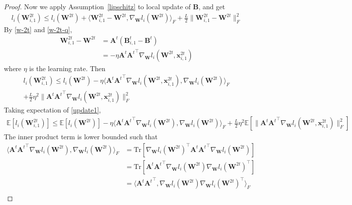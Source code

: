 \begin{proof}
Now we apply Assumption~\ref{lipschitz} to local update of $\mathbf{B}$, and get
\begin{align}
    l_i(\mathbf{W}_{i,1}^{2t}) \leq l_i(\mathbf{W}^{2t}) + \langle \mathbf{W}_{i,1}^{2t}- \mathbf{W}^{2t}, \nabla_{\mathbf{W}} l_i(\mathbf{W}^{2t})\rangle_F + \frac{L}{2} \| \mathbf{W}_{i,1}^{2t} - \mathbf{W}^{2t} \|_F^2 \label{eq:lipschitz-1}
\end{align}
By \eqref{w-2t} and \eqref{w-2t-q}, 
\begin{align}
    \mathbf{W}_{i,1}^{2t} - \mathbf{W}^{2t} &= \mathbf{A}^t (\mathbf{B}_{i,1}^t-\mathbf{B}^t) \label{eq:gd-fixA}\\
    & = -\eta \mathbf{A}^t {\mathbf{A}^t}^\top \nabla_{\mathbf{W}} l_i(\mathbf{W}^{2t},\mathbf{x}_{i,1}^{2t})
\end{align}
where $\eta$ is the learning rate. Then
\begin{align}
    l_i(\mathbf{W}_{i,1}^{2t}) \leq l_i(\mathbf{W}^{2t}) -\eta \langle \mathbf{A}^t {\mathbf{A}^t}^\top \nabla_{\mathbf{W}} l_i(\mathbf{W}^{2t},\mathbf{x}_{i,1}^{2t}), \nabla_{\mathbf{W}} l_i(\mathbf{W}^{2t})\rangle_F \nonumber\\+ \frac{L}{2} \eta^2 \|  \mathbf{A}^t {\mathbf{A}^t}^\top \nabla_{\mathbf{W}} l_i(\mathbf{W}^{2t},\mathbf{x}_{i,1}^{2t}) \|_F^2 \label{update1}
\end{align}
Taking expectation of \eqref{update1},
\begin{align}
    \mathbb{E}[l_i(\mathbf{W}_{i,1}^{2t})] \leq \mathbb{E}[ l_i(\mathbf{W}^{2t})] - \eta \langle \mathbf{A}^t {\mathbf{A}^t}^\top \nabla_{\mathbf{W}} l_i(\mathbf{W}^{2t}), \nabla_{\mathbf{W}} l_i(\mathbf{W}^{2t})\rangle_F + \frac{L}{2} \eta^2  \mathbb{E}[\|  \mathbf{A}^t {\mathbf{A}^t}^\top \nabla_{\mathbf{W}} l_i(\mathbf{W}^{2t},\mathbf{x}_{i,1}^{2t}) \|_F^2 ] \label{exp-1}
\end{align}
The inner product term is lower bounded such that
\begin{align}
    \langle \mathbf{A}^t {\mathbf{A}^t}^\top \nabla_{\mathbf{W}} l_i(\mathbf{W}^{2t}), \nabla_{\mathbf{W}} l_i(\mathbf{W}^{2t})\rangle_F & = \text{Tr}[{\nabla_{\mathbf{W}} l_i (\mathbf{W}^{2t})}^\top \mathbf{A}^t {\mathbf{A}^t}^\top \nabla_{\mathbf{W}} l_i (\mathbf{W}^{2t})] \\
    & = \text{Tr}[ \mathbf{A}^t {\mathbf{A}^t}^\top \nabla_{\mathbf{W}} l_i (\mathbf{W}^{2t}){\nabla_{\mathbf{W}} l_i (\mathbf{W}^{2t})}^\top] \\
     & =  \langle \mathbf{A}^t {\mathbf{A}^t}^\top , \nabla_{\mathbf{W}} l_i(\mathbf{W}^{2t}){\nabla_{\mathbf{W}} l_i(\mathbf{W}^{2t})}^\top \rangle_F\\

\end{align}
\end{proof}
